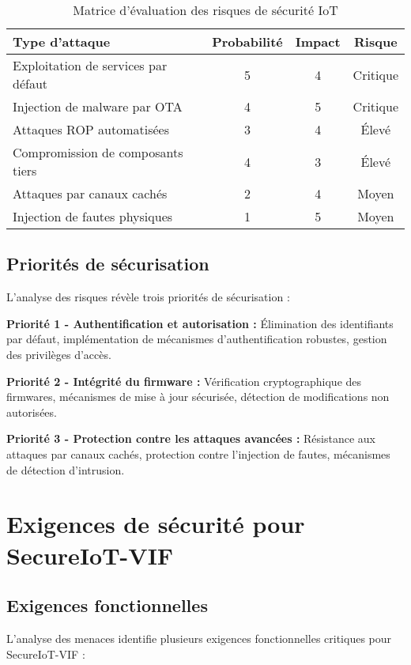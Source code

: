 \begin{table}[h]
\centering
\caption{Matrice d'évaluation des risques de sécurité IoT}
\label{tab:risk-matrix}
\begin{tabular}{|l|c|c|c|}
\hline
\textbf{Type d'attaque} & \textbf{Probabilité} & \textbf{Impact} & \textbf{Risque} \\
\hline
Exploitation de services par défaut & 5 & 4 & Critique \\
Injection de malware par OTA & 4 & 5 & Critique \\
Attaques ROP automatisées & 3 & 4 & Élevé \\
Compromission de composants tiers & 4 & 3 & Élevé \\
Attaques par canaux cachés & 2 & 4 & Moyen \\
Injection de fautes physiques & 1 & 5 & Moyen \\
\hline
\end{tabular}
\end{table}

\subsection{Priorités de sécurisation}

L'analyse des risques révèle trois priorités de sécurisation :

\textbf{Priorité 1 - Authentification et autorisation :} Élimination des identifiants par défaut, implémentation de mécanismes d'authentification robustes, gestion des privilèges d'accès.

\textbf{Priorité 2 - Intégrité du firmware :} Vérification cryptographique des firmwares, mécanismes de mise à jour sécurisée, détection de modifications non autorisées.

\textbf{Priorité 3 - Protection contre les attaques avancées :} Résistance aux attaques par canaux cachés, protection contre l'injection de fautes, mécanismes de détection d'intrusion.

\section{Exigences de sécurité pour SecureIoT-VIF}

\subsection{Exigences fonctionnelles}

L'analyse des menaces identifie plusieurs exigences fonctionnelles critiques pour SecureIoT-VIF :

